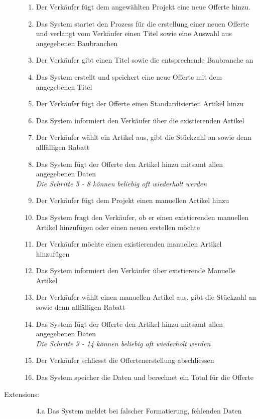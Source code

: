 \documentclass[a4paper,12pt]{article}
\begin{document}
\begin{description}
\begin{enumerate}
			\item Der Verkäufer fügt dem angewählten Projekt eine neue Offerte hinzu.
			\item Das System startet den Prozess für die erstellung einer neuen Offerte und
			verlangt vom Verkäufer einen Titel sowie eine Auswahl aus angegebenen Baubranchen
			\item Der Verkäufer gibt einen Titel sowie die entsprechende Baubranche an
			\item Das System erstellt und speichert eine neue Offerte mit dem 
				angegebenen Titel
			\item Der Verkäufer fügt der Offerte einen Standardisierten Artikel hinzu
			\item Das System informiert den Verkäufer über die existierenden Artikel
			\item Der Verkäufer wählt ein Artikel aus, gibt die Stückzahl an sowie 
			denn allfälligen Rabatt
			\item Das System fügt der Offerte den Artikel hinzu mitsamt allen angegebenen Daten\\
			\emph{Die Schritte 5 - 8 können beliebig oft wiederholt werden}
			\item Der Verkäufer fügt dem Projekt einen manuellen Artikel hinzu
			\item Das System fragt den Verkäufer, ob er einen existierenden manuellen Artikel hinzufügen 
			oder einen neuen erstellen möchte
			\item Der Verkäufer möchte einen existierenden manuellen Artikel hinzufügen
			\item Das System informiert den Verkäufer über existierende Manuelle Artikel
			\item Der Verkäufer wählt einen manuellen Artikel aus, gibt die Stückzahl an sowie 
			denn allfälligen Rabatt
			\item Das System fügt der Offerte den Artikel hinzu mitsamt allen angegebenen Daten\\
			\emph{Die Schritte 9 - 14 können beliebig oft wiederholt werden}
			\item Der Verkäufer schliesst die Offertenerstellung abschliessen
			\item Das System speicher die Daten und berechnet ein Total für die Offerte
		\end{enumerate}
		\newpage
		\item[Extensions:] \hfill  
		\begin{enumerate}
			\item [4.a] Das System meldet bei falscher Formatierung, fehlenden Daten

\end{enumerate}
\end{description}
\end{document}
